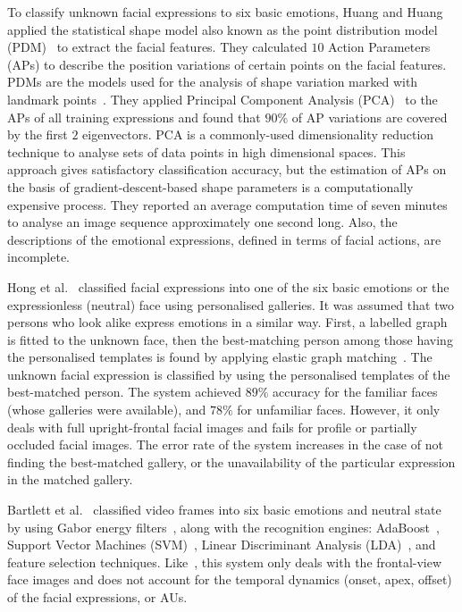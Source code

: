 \documentclass[10pt,journal,cspaper,compsoc]{IEEEtran}
\begin{document}
To classify unknown facial expressions to six basic emotions, Huang and Huang~\cite{huang97} applied the statistical shape model also known as the point distribution model (PDM)~\cite{cootes1995combining} to extract the facial features. They calculated $10$ Action Parameters (APs) to describe the position variations of certain points on the facial features. PDMs are the models used for the analysis of shape variation marked with landmark points~\cite{cootes1992training}. They applied Principal Component Analysis (PCA)~\cite{Marsland09} to the APs of all training expressions and found that $90\%$ of AP variations are covered by the first $2$ eigenvectors. PCA is a commonly-used dimensionality reduction technique to analyse sets of data points in high dimensional spaces. This approach gives satisfactory classification accuracy, but the estimation of APs on the basis of gradient-descent-based shape parameters is a computationally expensive process. They reported an average computation time of seven minutes to analyse an image sequence approximately one second long. Also, the descriptions of the emotional expressions, defined in terms of facial actions, are incomplete.

Hong et al.~\cite{hong98} classified facial expressions into one of the six basic emotions or the expressionless (neutral) face using personalised galleries. It was assumed that two persons who look alike express emotions in a similar way. First, a labelled graph is fitted to the unknown face, then the best-matching person among those having the personalised templates is found by applying elastic graph matching~\cite{wiskott95}. The unknown facial expression is classified by using the personalised templates of the best-matched person. The system achieved $89\%$ accuracy for the familiar faces (whose galleries were available), and $78\%$ for unfamiliar faces. However, it only deals with full upright-frontal facial images and fails for profile or partially occluded facial images. The error rate of the system increases in the case of not finding the best-matched gallery, or the unavailability of the particular expression in the matched gallery.

Bartlett et al.~\cite{bartlett04} classified video frames into six basic emotions and neutral state by using Gabor energy filters~\cite{movellan02tutorial}, along with the recognition engines: AdaBoost~\cite{Marsland09}, Support Vector Machines (SVM)~\cite{Michel03}, Linear Discriminant Analysis (LDA)~\cite{Marsland09}, and feature selection techniques. Like~\cite{hong98}, this system only deals with the frontal-view face images and does not account for the temporal dynamics (onset, apex, offset) of the facial expressions, or AUs.
\end{document}
